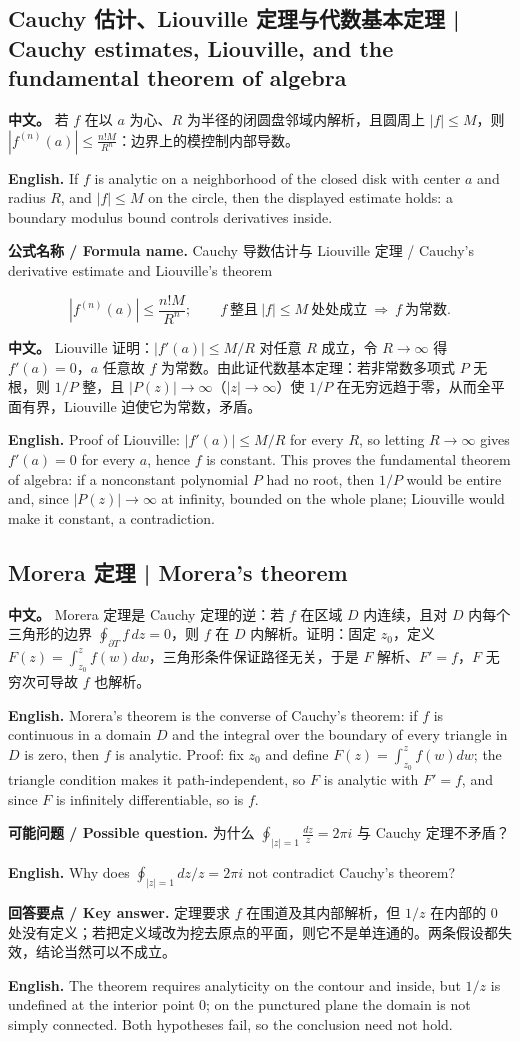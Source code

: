 \documentclass[UTF8,11pt,a4paper]{ctexart}
\newcommand{\EN}[1]{\par\noindent \textbf{English.} #1\par}
\newcommand{\FORMULA}[2]{\par\noindent\textbf{公式名称 / Formula name.} #1 / #2\par}
\newcommand{\ASK}[4]{\par\noindent \textbf{可能问题 / Possible question.} #1\par\EN{#2}\noindent \textbf{回答要点 / Key answer.} #3\par\EN{#4}\medskip}
\newcommand{\APS}[2]{\par\noindent\textbf{中文。} #1\par\noindent\textbf{English.} #2\par\smallskip}
\begin{document}
\subsection{Cauchy 估计、Liouville 定理与代数基本定理 | Cauchy estimates, Liouville, and the fundamental theorem of algebra}
\APS{若 $f$ 在以 $a$ 为心、$R$ 为半径的闭圆盘邻域内解析，且圆周上 $|f|\le M$，则 $|f^{(n)}(a)|\le\frac{n!M}{R^n}$：边界上的模控制内部导数。}{If $f$ is analytic on a neighborhood of the closed disk with center $a$ and radius $R$, and $|f|\le M$ on the circle, then the displayed estimate holds: a boundary modulus bound controls derivatives inside.}
\FORMULA{Cauchy 导数估计与 Liouville 定理}{Cauchy's derivative estimate and Liouville's theorem}
\[
|f^{(n)}(a)|\le\frac{n!M}{R^n};\qquad
f\ \text{整且}\ |f|\le M\ \text{处处成立}\ \Longrightarrow\ f\ \text{为常数}.
\]
\APS{Liouville 证明：$|f'(a)|\le M/R$ 对任意 $R$ 成立，令 $R\to\infty$ 得 $f'(a)=0$，$a$ 任意故 $f$ 为常数。由此证代数基本定理：若非常数多项式 $P$ 无根，则 $1/P$ 整，且 $|P(z)|\to\infty$（$|z|\to\infty$）使 $1/P$ 在无穷远趋于零，从而全平面有界，Liouville 迫使它为常数，矛盾。}{Proof of Liouville: $|f'(a)|\le M/R$ for every $R$, so letting $R\to\infty$ gives $f'(a)=0$ for every $a$, hence $f$ is constant. This proves the fundamental theorem of algebra: if a nonconstant polynomial $P$ had no root, then $1/P$ would be entire and, since $|P(z)|\to\infty$ at infinity, bounded on the whole plane; Liouville would make it constant, a contradiction.}

\subsection{Morera 定理 | Morera's theorem}
\APS{Morera 定理是 Cauchy 定理的逆：若 $f$ 在区域 $D$ 内连续，且对 $D$ 内每个三角形的边界 $\oint_{\partial T}f\,dz=0$，则 $f$ 在 $D$ 内解析。证明：固定 $z_0$，定义 $F(z)=\int_{z_0}^{z}f(w)dw$，三角形条件保证路径无关，于是 $F$ 解析、$F'=f$，$F$ 无穷次可导故 $f$ 也解析。}{Morera's theorem is the converse of Cauchy's theorem: if $f$ is continuous in a domain $D$ and the integral over the boundary of every triangle in $D$ is zero, then $f$ is analytic. Proof: fix $z_0$ and define $F(z)=\int_{z_0}^{z}f(w)dw$; the triangle condition makes it path-independent, so $F$ is analytic with $F'=f$, and since $F$ is infinitely differentiable, so is $f$.}
\ASK{为什么 $\oint_{|z|=1}\frac{dz}{z}=2\pi i$ 与 Cauchy 定理不矛盾？}{Why does $\oint_{|z|=1}dz/z=2\pi i$ not contradict Cauchy's theorem?}{定理要求 $f$ 在围道及其内部解析，但 $1/z$ 在内部的 $0$ 处没有定义；若把定义域改为挖去原点的平面，则它不是单连通的。两条假设都失效，结论当然可以不成立。}{The theorem requires analyticity on the contour and inside, but $1/z$ is undefined at the interior point $0$; on the punctured plane the domain is not simply connected. Both hypotheses fail, so the conclusion need not hold.}
\end{document}
